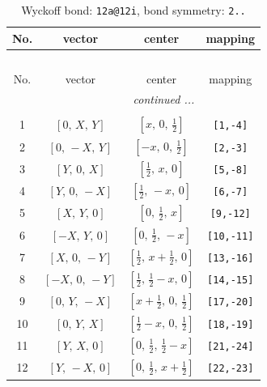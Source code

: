 \documentclass[fleqn,8pt]{jsarticle}
\begin{document}
\begin{longtable}{cccc}
\caption{Wyckoff bond: {\tt 12a@12i}, bond symmetry: {\tt 2..}}
 \\
 \hline \hline
No. & vector & center & mapping \\ \hline \endfirsthead

\multicolumn{3}{l}{\tablename\ \thetable{}} \\
 \hline \hline
No. & vector & center & mapping \\ \hline \endhead

 \hline \hline
\multicolumn{3}{r}{\footnotesize\it continued ...} \\ \endfoot

 \hline \hline
\multicolumn{3}{r}{} \\ \endlastfoot

1 & $\left[ 0,\, X,\, Y \right]$ & $\left[ x,\, 0,\, \frac{1}{2} \right]$ & {\tt [1,-4]} \\ \hline
2 & $\left[ 0,\, - X,\, Y \right]$ & $\left[ - x,\, 0,\, \frac{1}{2} \right]$ & {\tt [2,-3]} \\ \hline
3 & $\left[ Y,\, 0,\, X \right]$ & $\left[ \frac{1}{2},\, x,\, 0 \right]$ & {\tt [5,-8]} \\ \hline
4 & $\left[ Y,\, 0,\, - X \right]$ & $\left[ \frac{1}{2},\, - x,\, 0 \right]$ & {\tt [6,-7]} \\ \hline
5 & $\left[ X,\, Y,\, 0 \right]$ & $\left[ 0,\, \frac{1}{2},\, x \right]$ & {\tt [9,-12]} \\ \hline
6 & $\left[ - X,\, Y,\, 0 \right]$ & $\left[ 0,\, \frac{1}{2},\, - x \right]$ & {\tt [10,-11]} \\ \hline
7 & $\left[ X,\, 0,\, - Y \right]$ & $\left[ \frac{1}{2},\, x + \frac{1}{2},\, 0 \right]$ & {\tt [13,-16]} \\ \hline
8 & $\left[ - X,\, 0,\, - Y \right]$ & $\left[ \frac{1}{2},\, \frac{1}{2} - x,\, 0 \right]$ & {\tt [14,-15]} \\ \hline
9 & $\left[ 0,\, Y,\, - X \right]$ & $\left[ x + \frac{1}{2},\, 0,\, \frac{1}{2} \right]$ & {\tt [17,-20]} \\ \hline
10 & $\left[ 0,\, Y,\, X \right]$ & $\left[ \frac{1}{2} - x,\, 0,\, \frac{1}{2} \right]$ & {\tt [18,-19]} \\ \hline
11 & $\left[ Y,\, X,\, 0 \right]$ & $\left[ 0,\, \frac{1}{2},\, \frac{1}{2} - x \right]$ & {\tt [21,-24]} \\ \hline
12 & $\left[ Y,\, - X,\, 0 \right]$ & $\left[ 0,\, \frac{1}{2},\, x + \frac{1}{2} \right]$ & {\tt [22,-23]} \\
\end{longtable}
\end{document}
